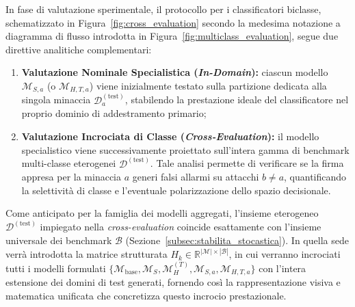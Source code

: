 In fase di valutazione sperimentale, il protocollo per i classificatori biclasse, schematizzato in Figura~\ref{fig:cross_evaluation} secondo la medesima notazione a diagramma di flusso introdotta in Figura~\ref{fig:multiclass_evaluation}, segue due direttive analitiche complementari:
\begin{enumerate}
    \item \textbf{Valutazione Nominale Specialistica (\textit{In-Domain}):} ciascun modello $\mathcal{M}_{S, a}$ (o $\mathcal{M}_{H, T, a}$) viene inizialmente testato sulla partizione dedicata alla singola minaccia $\mathcal{D}_a^{(\text{test})}$, stabilendo la prestazione ideale del classificatore nel proprio dominio di addestramento primario;
    \item \textbf{Valutazione Incrociata di Classe (\textit{Cross-Evaluation}):} il modello specialistico viene successivamente proiettato sull'intera gamma di benchmark multi-classe eterogenei $\mathcal{D}^{(\text{test})}$. Tale analisi permette di verificare se la firma appresa per la minaccia $a$ generi falsi allarmi su attacchi $b \neq a$, quantificando la selettività di classe e l'eventuale polarizzazione dello spazio decisionale.
\end{enumerate}

Come anticipato per la famiglia dei modelli aggregati, l'insieme eterogeneo $\mathcal{D}^{(\text{test})}$ impiegato nella \textit{cross-evaluation} coincide esattamente con l'insieme universale dei benchmark $\mathcal{B}$ (Sezione~\ref{subsec:stabilita_stocastica}). In quella sede verrà introdotta la matrice strutturata $H_k \in \mathbb{R}^{|\mathcal{M}|\times|\mathcal{B}|}$, in cui verranno incrociati tutti i modelli formulati $\{\mathcal{M}_{\text{base}}, \mathcal{M}_S, \mathcal{M}_H^{(T)}, \mathcal{M}_{S,a}, \mathcal{M}_{H,T,a}\}$ con l'intera estensione dei domini di test generati, fornendo così la rappresentazione visiva e matematica unificata che concretizza questo incrocio prestazionale.

